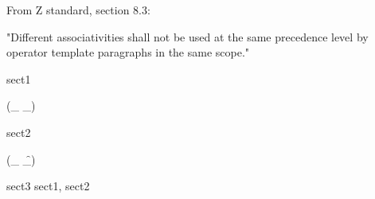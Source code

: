 From Z standard, section 8.3:

  "Different associativities shall not be used at the same precedence level
  by operator template paragraphs in the same scope."

\begin{zsection}
\SECTION sect1
\end{zsection}
\begin{zed}
   \leftassoc (\_ \e \_)
\end{zed}

\begin{zsection}
\SECTION sect2
\end{zsection}

\begin{zed}
   \rightassoc (\_ \f \_)
\end{zed}

\begin{zsection}
\SECTION sect3 \parents sect1, sect2
\end{zsection}
